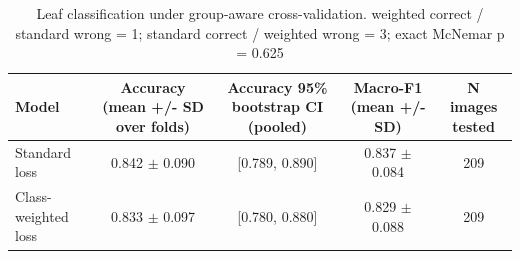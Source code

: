 \begin{table}[t]
\centering
\caption{Leaf classification under group-aware cross-validation. weighted correct / standard wrong = 1; standard correct / weighted wrong = 3; exact McNemar p = 0.625}
\label{tab:vision-cv}
\begin{tabular}{lcccc}
\toprule
Model & Accuracy (mean +/- SD over folds) & Accuracy 95\% bootstrap CI (pooled) & Macro-F1 (mean +/- SD) & N images tested \\
\midrule
Standard loss & 0.842 $\pm$ 0.090 & [0.789, 0.890] & 0.837 $\pm$ 0.084 & 209 \\
Class-weighted loss & 0.833 $\pm$ 0.097 & [0.780, 0.880] & 0.829 $\pm$ 0.088 & 209 \\
\bottomrule
\end{tabular}
\end{table}